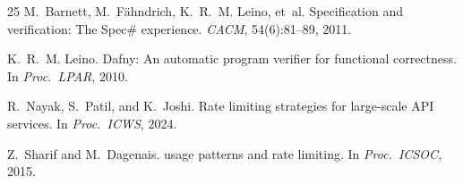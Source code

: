\documentclass[11pt]{article}
\begin{document}
\begin{thebibliography}{25}
M.~Barnett, M.~F\"ahndrich, K.~R.~M. Leino, et~al.
\newblock Specification and verification: The {Spec\#}
  experience.
\newblock \emph{CACM}, 54(6):81--89, 2011.

K.~R.~M. Leino.
\newblock Dafny: An automatic program verifier for functional
  correctness.
\newblock In \emph{Proc.\ LPAR}, 2010.

R.~Nayak, S.~Patil, and K.~Joshi.
\newblock Rate limiting strategies for large-scale {API}
  services.
\newblock In \emph{Proc.\ ICWS}, 2024.

Z.~Sharif and M.~Dagenais.
 usage patterns and rate limiting.
\newblock In \emph{Proc.\ ICSOC}, 2015.

\end{thebibliography}
\end{document}
